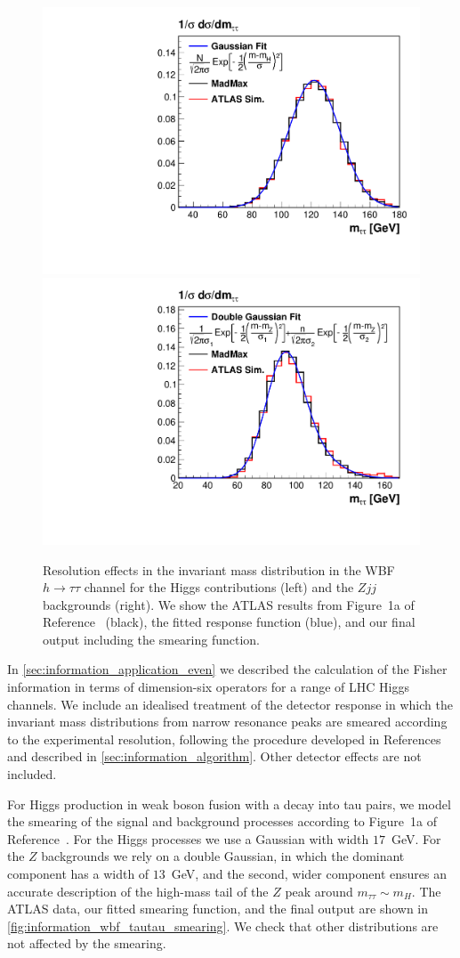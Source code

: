 \begin{figure}
  \includegraphics[width=0.49 \textwidth]{fig/information/wbf_tautau_smearing_mh}%
  \includegraphics[width=0.49 \textwidth]{fig/information/wbf_tautau_smearing_mz}%
  \caption{Resolution effects in the invariant mass distribution in
    the WBF $h \to \tau \tau$ channel for the Higgs contributions
    (left) and the $Zjj$ backgrounds (right). We show the ATLAS
    results from Figure~1a of Reference~\cite{Aad:2015vsa} (black),
    the fitted response function (blue), and our final
     output including the smearing function.}
  \label{fig:information_wbf_tautau_smearing}
\end{figure}

In \autoref{sec:information_application_even} we described the
calculation of the Fisher information in terms of dimension-six
operators for a range of LHC Higgs channels. We include an idealised
treatment of the detector response in which the invariant mass
distributions from narrow resonance peaks are smeared according to the
experimental resolution, following the procedure developed in
References~\cite{Cranmer:2006zs, Plehn:2013paa} and described in
\autoref{sec:information_algorithm}. Other detector effects are not
included. 

For Higgs production in weak boson fusion with a decay into tau pairs,
we model the smearing of the signal and background processes according
to Figure~1a of Reference~\cite{Aad:2015vsa}. For the Higgs processes
we use a Gaussian with width $17$~GeV. For the $Z$ backgrounds we rely
on a double Gaussian, in which the dominant component has a width of
$13$~GeV, and the second, wider component ensures an accurate
description of the high-mass tail of the $Z$ peak around
$m_{\tau\tau} \sim m_H$. The ATLAS data, our fitted smearing function,
and the final  output are shown in
\autoref{fig:information_wbf_tautau_smearing}. We check that other
distributions are not affected by the smearing.

